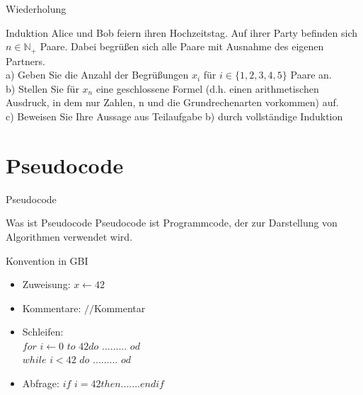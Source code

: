 	\begin{frame} {Wiederholung}
		\begin{block}{Induktion}
			Alice und Bob feiern ihren Hochzeitstag. Auf ihrer Party befinden sich $n \in \mathbb{N}_+$ Paare.
			Dabei begrüßen sich alle Paare mit Ausnahme des eigenen Partners.\\
			\vspace{10pt}
			a) Geben Sie die Anzahl der Begrüßungen $x_i$ für $i \in \{1,2,3,4,5\}$ Paare an.\\
			\vspace{10pt}
			b) Stellen Sie für $x_n$ eine geschlossene Formel (d.h. einen arithmetischen Ausdruck, in dem nur Zahlen, n und die Grundrechenarten vorkommen) auf.\\
			\vspace{10pt}
			c) Beweisen Sie Ihre Aussage aus Teilaufgabe b) durch vollständige Induktion
		\end{block}
	\end{frame}
	
	
	\section{Pseudocode}
	\begin{frame}{Pseudocode}
		\begin{block} {Was ist Pseudocode}
			Pseudocode ist Programmcode, der zur Darstellung von Algorithmen verwendet wird.\\
		\end{block}
		
		\begin{block} {Konvention in GBI}
			\begin{itemize}
				\item Zuweisung: $x \leftarrow 42$
				\pause
				\item Kommentare: $//$Kommentar
				\pause
				\item Schleifen: \\
				$for$ $i \leftarrow 0$ $to$ $42 do$ $.........$ $od$\\
				$while$ $i < 42$ $do$ $.........$ $od$
				\pause
				\item Abfrage: $if$ $i = 42 then ....... endif$
			\end{itemize}			 
		\end{block}
	\end{frame}
	
	
	
